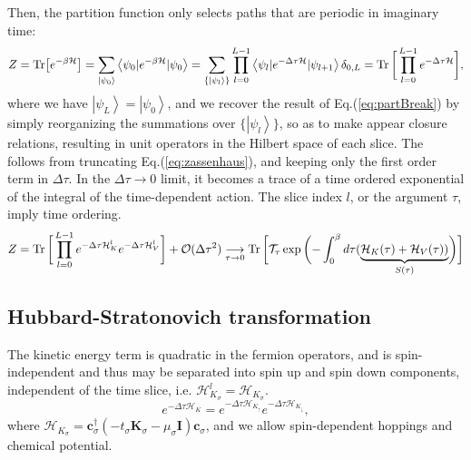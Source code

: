 Then, the partition function only selects paths that are periodic in imaginary time:
\begin{equation}
Z = \text{Tr} \big[ e^{-\beta \mathcal{H} } \big] = \sum_{\left| \psi_0 \right\rangle} \left\langle \psi_0 | e^{-\beta \mathcal{H}} | \psi_0 \right\rangle = \sum_{\{ \left| \psi_l \right\rangle \}} \prod_{l = 0}^{L - 1} \left\langle \psi_{l} | e^{-\Delta \tau \mathcal{H} } | \psi_{l+1} \right\rangle \delta_{0, L} = \operatorname{Tr} \bigg[ \prod_{l=0}^{L-1} e^{-\Delta\tau \mathcal{H} } \bigg] ,
\end{equation}
where we have $\left| \psi_L \right\rangle = \left| \psi_0 \right\rangle$, and we  recover the result of Eq.(\ref{eq:partBreak}) by simply reorganizing the summations over $\{ \left| \psi_l \right\rangle \}$, so as to make appear closure relations, resulting in unit operators in the Hilbert space of each slice.
The  follows from truncating Eq.(\ref{eq:zassenhaus}), and keeping only the first order term in $\Delta \tau$.
In the $\Delta \tau \rightarrow 0$ limit, it becomes a trace of a time ordered exponential of the integral of the time-dependent action.
The slice index $l$, or the argument $\tau$, imply time ordering.
\begin{equation}\label{eq:Z_propagator}
Z = \operatorname{Tr} \bigg[ \prod_{l=0}^{L-1} e^{-\Delta\tau \mathcal{H}_{K}^l } e^{-\Delta\tau \mathcal{H}_{V}^l } \bigg] + \mathcal{O}(\Delta \tau^2) \underset{\tau \rightarrow 0}{\longrightarrow}
 \operatorname{Tr} \bigg[ \mathcal{T}_\tau \exp \bigg( {- \int_0^\beta   d\tau ( \underbrace{\mathcal{H}_K (\tau) + \mathcal{H}_V ( \tau) ) }_{S(\tau)} } \bigg) \bigg]
\end{equation}

\subsection{Hubbard-Stratonovich transformation}\label{subsec:HStransf}

The kinetic energy term is quadratic in the fermion operators, and is spin-independent and thus may be separated into spin up and spin down components, independent of the time slice, i.e. $\mathcal{H}_{K_\sigma}^l = \mathcal{H}_{K_\sigma}$.
\begin{equation}
e^{-\Delta\tau \mathcal{H}_K} = e^{-\Delta\tau \mathcal{H}_{K_\uparrow}} e^{-\Delta\tau \mathcal{H}_{K_\downarrow}} ,
\end{equation}
where $\mathcal{H}_{K_\sigma} = \bm c_\sigma^\dagger (-t_\sigma \bm K_\sigma - \mu_\sigma \bm I )  \bm c_\sigma$, and we allow spin-dependent hoppings and chemical potential.

